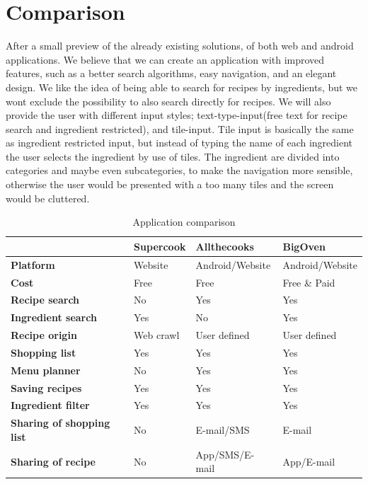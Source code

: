 \section{Comparison}
After a small preview of the already existing solutions, of both web and android applications. We believe that we can create an application with improved features, such as a better search algorithms, easy navigation, and an elegant design. We like the idea of being able to search for recipes by ingredients, but we wont exclude the possibility to also search directly for recipes. We will also provide the user with different input styles; text-type-input(free text for recipe search and ingredient restricted), and tile-input. Tile input is basically the same as ingredient restricted input, but instead of typing the name of each ingredient the user selects the ingredient by use of tiles. The ingredient are divided into categories and maybe even subcategories, to make the navigation more sensible, otherwise the user would be presented with a too many tiles and the screen would be cluttered.

\begin{table}[H]
\centering
\begin{tabular}{|l|l|l|l|}
\hline
 & \textbf{Supercook} & \textbf{Allthecooks} & \textbf{BigOven} \\
\hline
\textbf{Platform} & Website & Android/Website & Android/Website \\
\hline
\textbf{Cost} & Free & Free & Free \& Paid \\
\hline
\textbf{Recipe search} & No & Yes & Yes  \\
\hline
\textbf{Ingredient search} & Yes & No & Yes \\
\hline
\textbf{Recipe origin} & Web crawl & User defined & User defined \\
\hline
\textbf{Shopping list} & Yes & Yes & Yes \\
\hline
\textbf{Menu planner} & No & Yes & Yes \\
\hline
\textbf{Saving recipes} & Yes & Yes & Yes \\
\hline
\textbf{Ingredient filter} & Yes & Yes & Yes \\
\hline
\textbf{Sharing of shopping list} & No & E-mail/SMS & E-mail \\
\hline
\textbf{Sharing of recipe} & No & App/SMS/E-mail & App/E-mail \\
\hline
\end{tabular}
\caption{Application comparison}
\label{tab:appcomparison}
\end{table}

